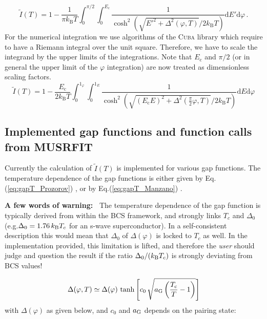 \documentclass[twoside]{article}
\begin{document}
\begin{equation}
\tilde{I}(T) = 1 - \frac{1}{\pi k_{\mathrm B}T}\int_0^{\pi/2}\int_{0}^{E_{\mathrm c}}\frac{1}{\cosh^2\left(\sqrt{E'^2+\Delta^2(\varphi,T)}/2k_{\mathrm B}T\right)}\mathrm{d}E'\mathrm{d}\varphi\,.
\end{equation}
For the numerical integration we use algorithms of the \textsc{Cuba} library \cite{cuba} which require to have a Riemann integral over the unit square. Therefore, we have to scale the integrand by the upper limits of the integrations. Note that $E_{\mathrm c}$ and $\pi/2$ (or in general the upper limit of the $\varphi$ integration) are now treated as dimensionless scaling factors.
\begin{equation}
\tilde{I}(T) =  1 - \frac{E_{\mathrm c}}{2k_{\mathrm B}T}\int_0^{1_{\varphi}}\int_{0}^{1_{E}}\frac{1}{\cosh^2\left(\sqrt{(E_{\mathrm c}E)^2+\Delta^2\left(\frac{\pi}{2}\varphi,T\right)}/2k_{\mathrm B}T\right)}\mathrm{d}E\mathrm{d}\varphi
\end{equation}

\subsection*{Implemented gap functions and function calls from MUSRFIT}
Currently the calculation of $\tilde{I}(T)$ is implemented for various gap functions.
The temperature dependence of the gap functions is either given by Eq.(\ref{eq:gapT_Prozorov}) \cite{Prozorov}, or by Eq.(\ref{eq:gapT_Manzano}) \cite{Manzano}.

\vspace{2mm}

\noindent \color{red}\textbf{A few words of warning:~}\color{black} The temperature dependence of the gap function is typically derived from within the BCS framework, 
and strongly links $T_c$ and $\Delta_0$ (e.g.\xspace $\Delta_0 = 1.76\, k_{\rm B} T_c$ for an s-wave superconductor). In a self-consistent 
description this would mean that $\Delta_0$ of $\Delta(\varphi)$ is locked to $T_c$ as well. In the implementation provided, this limitation 
is lifted, and therefore the \emph{user} should judge and question the result if the ratio $\Delta_0/(k_{\rm B}T_c)$ is strongly deviating from
BCS values! 

\begin{equation}\label{eq:gapT_Prozorov}
 \Delta(\varphi,T) \simeq \Delta(\varphi)\,\tanh\left[c_0\,\sqrt{a_{\rm G} \left(\frac{T_{\rm c}}{T}-1\right)}\right]
\end{equation}
\noindent with $\Delta(\varphi)$ as given below, and $c_0$ and $a_{\rm G}$ depends on the pairing state:
\end{document}
